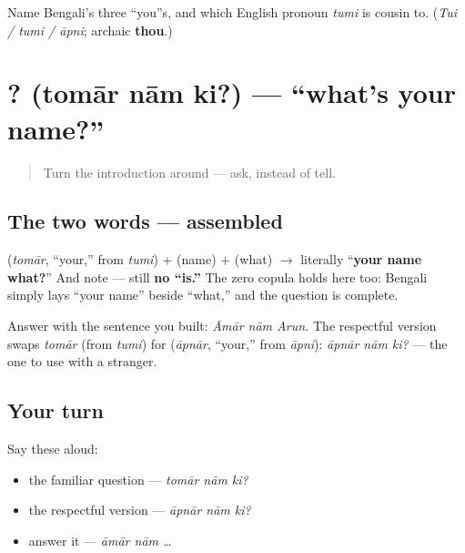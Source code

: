 \begin{tcolorbox}[breakable,colback=teal!4,colframe=teal!35!black,title={Before you move on}]
Name Bengali's three \textquotedblleft{}you\textquotedblright{}s, and which English pronoun \emph{tumi} is cousin to. (\emph{Tui / tumi / āpni}; archaic \textbf{thou}.)
\end{tcolorbox}
\section[\bn{তোমার} \bn{নাম} \bn{কি}?]{  ? (tomār nām ki?) — \textquotedblleft{}what's your name?\textquotedblright{}}

\label{lesson:BN-C02-tomar-naam-ki}



\begin{quote}
Turn the introduction around — ask, instead of tell.
\end{quote}

\subsection*{The two words — assembled}
\textbf{} (\emph{tomār}, \textquotedblleft{}your,\textquotedblright{} from \emph{tumi}) + \textbf{} (name) + \textbf{} (what) $\to$ literally \textquotedblleft{}\textbf{your name what?}\textquotedblright{} And note — still \textbf{no \textquotedblleft{}is.\textquotedblright{}} The zero copula holds here too: Bengali simply lays \textquotedblleft{}your name\textquotedblright{} beside \textquotedblleft{}what,\textquotedblright{} and the question is complete.

\begin{grammarlens}[title={Grammar Lens: answering, and the respectful form}]
Answer with the sentence you built: \emph{Āmār nām Arun.} The respectful version swaps \emph{tomār} (from \emph{tumi}) for \textbf{} (\emph{āpnār}, \textquotedblleft{}your,\textquotedblright{} from \emph{āpni}): \emph{āpnār nām ki?} — the one to use with a stranger.
\end{grammarlens}

\subsection*{Your turn}
Say these aloud:

\begin{itemize}
\raggedright
  \item the familiar question — \emph{tomār nām ki?}
  \item the respectful version — \emph{āpnār nām ki?}
  \item answer it — \emph{āmār nām …}
\end{itemize}

